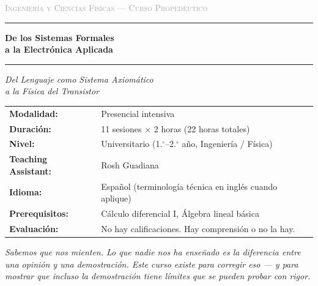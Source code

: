 \documentclass[11pt, letterpaper]{article}
\begin{document}
\begin{titlepage}
\begin{center}

\vspace*{0.8cm}
{\footnotesize\textsc{\textcolor{darkgray}{Ingenier\'ia y Ciencias F\'isicas --- Curso Propedéutico}}}
\vspace{0.4cm}

\textcolor{mitred}{\rule{\linewidth}{1.2pt}}
\vspace{0.4cm}

{\LARGE\bfseries De los Sistemas Formales\\[0.3em] a la Electr\'onica Aplicada}

\vspace{0.3cm}
\textcolor{mitred}{\rule{\linewidth}{1.2pt}}
\vspace{0.6cm}

{\large\itshape Del Lenguaje como Sistema Axiom\'atico\\
a la F\'isica del Transistor}

\vspace{1.4cm}

\begin{tabular}{ll}
\textbf{Modalidad:}           & Presencial intensiva \\[3pt]
\textbf{Duraci\'on:}          & 11 sesiones $\times$ 2 horas (22 horas totales) \\[3pt]
\textbf{Nivel:}               & Universitario (1.$^\circ$--2.$^\circ$ a\~no, Ingenier\'ia / F\'isica) \\[3pt]
\textbf{Teaching Assistant:}  & Rosh Guadiana \\[3pt]
\textbf{Idioma:}              & Espa\~nol (terminolog\'ia t\'ecnica en ingl\'es cuando aplique) \\[3pt]
\textbf{Prerequisitos:}       & C\'alculo diferencial I, \'Algebra lineal b\'asica \\[3pt]
\textbf{Evaluaci\'on:}        & No hay calificaciones. Hay comprensi\'on o no la hay. \\
\end{tabular}

\vspace{1.6cm}

\begin{tcolorbox}[
  colback=mitred!4, colframe=mitred,
  boxrule=0.8pt, left=10pt, right=10pt, top=8pt, bottom=8pt]
{\small\itshape
Sabemos que nos mienten. Lo que nadie nos ha ense\~nado es la diferencia entre
una opini\'on y una demostraci\'on. Este curso existe para corregir eso
--- y para mostrar que incluso la demostraci\'on tiene l\'imites
que se pueden probar con rigor.

}
\end{tcolorbox}
\end{center}
\end{titlepage}
\end{document}
